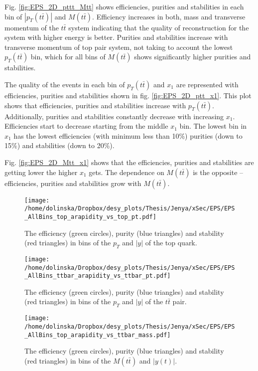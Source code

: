 Fig. \ref{fig:EPS_2D_pttt_Mtt} shows efficiencies, purities and stabilities in each bin of $|p_{T}(t\bar{t})|$ and $M(t\bar{t})$. Efficiency increases 
in both, mass and transverse momentum of the $t\bar{t}$ system indicating that the quality of reconstruction for the system with higher energy is better.
Purities and stabilities increase with transverse momentum of top pair system, not taking to account the lowest $p_{T}(t\bar{t})$ bin, which for all 
bins of $M(t\bar{t})$ shows significantly higher purities and stabilities.

The quality of the events in each bin of $p_{T}(t\bar{t})$ and  $x_{1}$ are represented with efficiencies, purities and stabilities shown in fig. \ref{fig:EPS_2D_ptt_x1}.
This plot shows that efficiencies, purities and stabilities increase with $p_{T}(t\bar{t})$. Additionally, purities and stabilities constantly decrease with 
increasing  $x_{1}$. Efficiencies start to decrease starting from the middle $x_{1}$ bin. The lowest bin in  $x_{1}$ has the lowest efficiencies
(with minimum less than 10\%) purities (down to 15\%) and stabilities (down to 20\%).

Fig. \ref{fig:EPS_2D_Mtt_x1} shows that the efficiencies, purities and stabilities are getting lower the higher $x_{1}$ gets. The dependence on $M(t\bar{t})$
is the opposite -- efficiencies, purities and stabilities grow with $M(t\bar{t})$.

\begin{figure}[h]
  \centering
  \texttt{[image: /home/dolinska/Dropbox/desy\_plots/Thesis/Jenya/xSec/EPS/EPS\_AllBins\_top\_arapidity\_vs\_top\_pt.pdf]}
  \caption{The efficiency (green circles), purity (blue triangles) and stability (red triangles) in bins of the $p_{T}$ and $|y|$ of the top quark.}
  \label{fig:EPS_2D_y_pt_ap}
\end{figure}

\begin{figure}[p]
  \centering
  \texttt{[image: /home/dolinska/Dropbox/desy\_plots/Thesis/Jenya/xSec/EPS/EPS\_AllBins\_ttbar\_arapidity\_vs\_ttbar\_pt.pdf]}
  \caption{The efficiency (green circles), purity (blue triangles) and stability (red triangles) in bins of the $p_{T}$ and $|y|$ of the $t\bar{t}$ pair.}
  \label{fig:EPS_2D_ptt_ytt}
\end{figure}

\begin{figure}[p]
  \centering
  \texttt{[image: /home/dolinska/Dropbox/desy\_plots/Thesis/Jenya/xSec/EPS/EPS\_AllBins\_top\_arapidity\_vs\_ttbar\_mass.pdf]}
  \caption{The efficiency (green circles), purity (blue triangles) and stability (red triangles) in bins of the $M(t\bar{t})$ and $|y(t)|$.}
  \label{fig:EPS_2D_Mtt_yt}
\end{figure}

